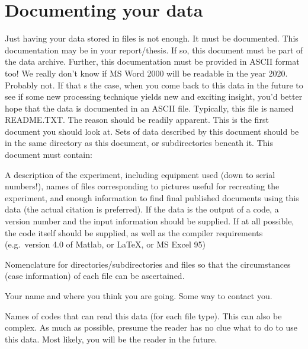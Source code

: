 \documentclass[a4paper]{article}
\begin{document}
\section{Documenting your data%
  \label{documenting-your-data}%
}

Just having your data stored in files is not enough. It must be
documented. This documentation may be in your report/thesis. If so, this
document must be part of the data archive. Further, this documentation
must be provided in ASCII format too! We really don't know if MS Word
2000 will be readable in the year 2020. Probably not. If that s the
case, when you come back to this data in the future to see if some new
processing technique yields new and exciting insight, you'd better hope
that the data is documented in an ASCII file. Typically, this file is
named \textquotedbl{}README.TXT\textquotedbl{}. The reason should be readily apparent. This is the
first document you should look at. Sets of data described by this
document should be in the same directory as this document, or
subdirectories beneath it. This document must contain:
\begin{list}{.}
{
\setlength{\rightmargin}{\leftmargin}
}

\item A description of the experiment, including equipment used (down to
serial numbers!), names of files corresponding to pictures useful for
recreating the experiment, and enough information to find final
published documents using this data (the actual citation is
preferred). If the data is the output of a code, a version number and
the input information should be supplied. If at all possible, the
code itself should be supplied, as well as the compiler requirements
(e.g.~version 4.0 of Matlab, or LaTeX, or MS Excel 95)

\item Nomenclature for directories/subdirectories and files so that the
circumstances (case information) of each file can be ascertained.

\item Your name and where you think you are going. Some way to contact you.

\item Names of codes that can read this data (for each file type). This can
also be complex. As much as possible, presume the reader has no clue
what to do to use this data. Most likely, you will be the reader in
the future.
\end{list}
\end{document}
